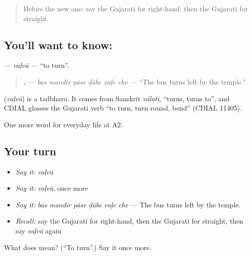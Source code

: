 \label{lesson:GU-C193-valvu-turn}



\begin{quote}
Before the new one: say the Gujarati for right-hand, then the Gujarati for straight.
\end{quote}

\subsection*{You'll want to know: }
\textbf{} — \emph{vaḷvũ} — \textquotedblleft{}to turn\textquotedblright{}.

\begin{quote}
\textbf{     .} — \emph{bas mandir pāse ḍābe vaḷe che} — \textquotedblleft{}The bus turns left by the temple.\textquotedblright{}
\end{quote}

\begin{cousinweb}
\textbf{} (\emph{vaḷvũ}) is a tadbhava. It comes from Sanskrit \emph{válati}, \textquotedblleft{}turns, turns to\textquotedblright{}, and CDIAL glosses the Gujarati verb \textquotedblleft{}to turn, turn round, bend\textquotedblright{} (CDIAL 11405).
\end{cousinweb}

\begin{grammarlens}[title={What you've built}]
One more word for everyday life at A2.
\end{grammarlens}

\subsection*{Your turn}
\begin{itemize}
\raggedright
  \item \emph{Say it:} \emph{vaḷvũ}
  \item \emph{Say it:} \emph{vaḷvũ}, once more
  \item \emph{Say it:} \emph{bas mandir pāse ḍābe vaḷe che} — The bus turns left by the temple.
  \item \emph{Recall:} say the Gujarati for right-hand, then the Gujarati for straight, then say \emph{vaḷvũ} again
\end{itemize}

\begin{tcolorbox}[breakable,colback=teal!4,colframe=teal!35!black,title={Before you move on}]
What does  mean? (\textquotedblleft{}To turn\textquotedblright{}.) Say it once more.
\end{tcolorbox}
